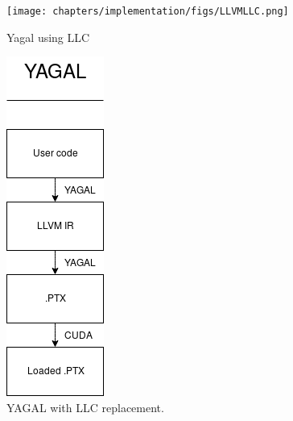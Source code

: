 \begin{figure}[!htb]
    \centering
    \begin{minipage}{.7\textwidth}
        \centering
        \texttt{[image: chapters/implementation/figs/LLVMLLC.png]}
        \caption{Yagal using LLC}
        \label{fig:prob1_6_2}
    \end{minipage}%
    \begin{minipage}{0.4\textwidth}
        \centering
        \includegraphics[width=0.5\linewidth]{chapters/implementation/figs/YAGALLLC.png}
        \caption{YAGAL with LLC replacement.}
        \label{fig:prob1_6_1}
    \end{minipage}
\end{figure}

